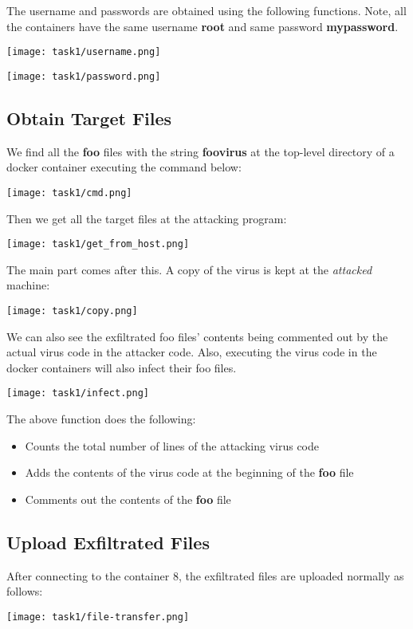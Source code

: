 \documentclass{article}
\begin{document}
The username and passwords are obtained using the following functions. Note, all the containers have the same username \textbf{root} and same password \textbf{mypassword}.
\begin{center}
    \texttt{[image: task1/username.png]}
\end{center}
\begin{center}
    \texttt{[image: task1/password.png]}
\end{center}


\subsection{Obtain Target Files}
We find all the \textbf{foo} files with the string \textbf{foovirus} at the top-level directory of a docker container executing the command below:
\begin{center}
    \texttt{[image: task1/cmd.png]}
\end{center}

Then we get all the target files at the attacking program:
\begin{center}
    \texttt{[image: task1/get\_from\_host.png]}
\end{center}

The main part comes after this. A copy of the virus is kept at the \textit{attacked} machine:
\begin{center}
    \texttt{[image: task1/copy.png]}
\end{center}

We can also see the exfiltrated foo files' contents being commented out by the actual virus code in the attacker code. Also, executing the virus code in the docker containers will also infect their foo files. 

\begin{center}
    \texttt{[image: task1/infect.png]}
\end{center}
The above function does the following:
\begin{itemize}
    \item Counts the total number of lines of the attacking virus code
    \item Adds the contents of the virus code at the beginning of the \textbf{foo} file
    \item Comments out the contents of the \textbf{foo} file
\end{itemize}


\subsection{Upload Exfiltrated Files}
After connecting to the container $8$, the exfiltrated files are uploaded normally as follows: 
\begin{center}
    \texttt{[image: task1/file-transfer.png]}
\end{center}
\end{document}
